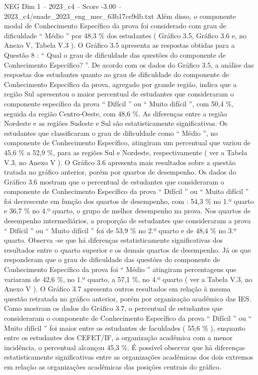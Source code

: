 \begin{textsample}{NEG Dim 1 – 2023\_c4 – Score -3.00 – 2023\_c4/enade\_2023\_eng\_mec\_63b17ce9db.txt}
Além disso, o componente modal de Conhecimento Específico da prova foi considerado com grau de dificuldade “ Médio ” por 48,3 \% dos estudantes ( Gráfico 3.5, Gráfico 3.6 e, no Anexo V, Tabela V.3 ).
O Gráfico 3.5 apresenta as respostas obtidas para a Questão 8 : “ Qual o grau de dificuldade das questões do componente de Conhecimento Específico? ”.
De acordo com os dados do Gráfico 3.5, a análise das respostas dos estudantes quanto ao grau de dificuldade do componente de Conhecimento Específico da prova, agregado por grande região, indica que a região Sul apresentou o maior percentual de estudantes que consideraram o componente específico da prova “ Difícil ” ou “ Muito difícil ”, com 50,4 \%, seguida da região Centro-Oeste, com 48,6 \%.
As diferenças entre a região Nordeste e as regiões Sudeste e Sul são estatisticamente significativas.
Os estudantes que classificaram o grau de dificuldade como “ Médio ”, no componente de Conhecimento Específico, atingiram um percentual que variou de 45,6 \% a 52,9 \%, para as regiões Sul e Nordeste, respectivamente ( ver a Tabela V.3, no Anexo V ).
O Gráfico 3.6 apresenta mais resultados sobre a questão tratada no gráfico anterior, porém por quartos de desempenho.
Os dados do Gráfico 3.6 mostram que o percentual de estudantes que consideraram o componente de Conhecimento Específico da prova “ Difícil ” ou “ Muito difícil ” foi decrescente em função dos quartos de desempenho, com : 54,3 \% no 1.º quarto e 36,7 \% no 4.º quarto, o grupo de melhor desempenho na prova.
Nos quartos de desempenho intermediários, a proporção de estudantes que consideraram a prova “ Difícil ” ou “ Muito difícil ” foi de 53,9 \% no 2.º quarto e de 48,4 \% no 3.º quarto.
Observa -se que há diferenças estatisticamente significativas dos resultados entre o quarto superior e os demais quartos de desempenho.
Já os que responderam que o grau de dificuldade das questões do componente de Conhecimento Específico da prova foi “ Médio ” atingiram percentagens que variaram de 42,6 \%, no 1.º quarto, a 57,1 \%, no 4.º quarto ( ver a Tabela V.3, no Anexo V ).
O Gráfico 3.7 apresenta outros resultados em relação à mesma questão retratada no gráfico anterior, porém por organização acadêmica das IES.
Como mostram os dados do Gráfico 3.7, o percentual de estudantes que consideraram o componente de Conhecimento Específico da prova “ Difícil ” ou “ Muito difícil ” foi maior entre os estudantes de faculdades ( 55,6 \% ), enquanto entre os estudantes dos CEFET/IF, a organização acadêmica com a menor incidência, o percentual alcançou 45,3 \%.
É possível observar que há diferenças estatisticamente significativas entre as organizações acadêmicas dos dois extremos em relação as organizações acadêmicas das posições centrais do gráfico.

\end{textsample}

